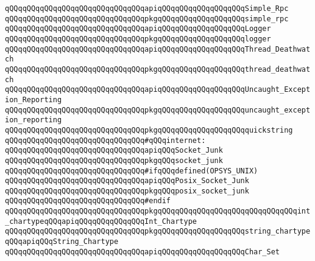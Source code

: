 \newline
\verb|qQQqqQQqqQQqqQQqqQQqqQQqqQQqqQQqapiqQQqqQQqqQQqqQQqqQQqSimple_Rpc|\newline
\verb|qQQqqQQqqQQqqQQqqQQqqQQqqQQqqQQqpkgqQQqqQQqqQQqqQQqqQQqsimple_rpc|\newline
\newline
\verb|qQQqqQQqqQQqqQQqqQQqqQQqqQQqqQQqapiqQQqqQQqqQQqqQQqqQQqLogger|\newline
\verb|qQQqqQQqqQQqqQQqqQQqqQQqqQQqqQQqpkgqQQqqQQqqQQqqQQqqQQqlogger|\newline
\newline
\verb|qQQqqQQqqQQqqQQqqQQqqQQqqQQqqQQqapiqQQqqQQqqQQqqQQqqQQqThread_Deathwatch|\newline
\verb|qQQqqQQqqQQqqQQqqQQqqQQqqQQqqQQqpkgqQQqqQQqqQQqqQQqqQQqthread_deathwatch|\newline
\newline
\verb|qQQqqQQqqQQqqQQqqQQqqQQqqQQqqQQqapiqQQqqQQqqQQqqQQqqQQqUncaught_Exception_Reporting|\newline
\verb|qQQqqQQqqQQqqQQqqQQqqQQqqQQqqQQqpkgqQQqqQQqqQQqqQQqqQQquncaught_exception_reporting|\newline
\newline
\verb|qQQqqQQqqQQqqQQqqQQqqQQqqQQqqQQqpkgqQQqqQQqqQQqqQQqqQQqquickstring|\newline
\newline
\verb|qQQqqQQqqQQqqQQqqQQqqQQqqQQqqQQq#qQQqinternet:|\newline
\verb|qQQqqQQqqQQqqQQqqQQqqQQqqQQqqQQqapiqQQqSocket_Junk|\newline
\verb|qQQqqQQqqQQqqQQqqQQqqQQqqQQqqQQqpkgqQQqsocket_junk|\newline
\verb|qQQqqQQqqQQqqQQqqQQqqQQqqQQqqQQq#ifqQQqdefined(OPSYS_UNIX)|\newline
\verb|qQQqqQQqqQQqqQQqqQQqqQQqqQQqqQQqapiqQQqPosix_Socket_Junk|\newline
\verb|qQQqqQQqqQQqqQQqqQQqqQQqqQQqqQQqpkgqQQqposix_socket_junk|\newline
\verb|qQQqqQQqqQQqqQQqqQQqqQQqqQQqqQQq#endif|\newline
\newline
\verb|qQQqqQQqqQQqqQQqqQQqqQQqqQQqqQQqpkgqQQqqQQqqQQqqQQqqQQqqQQqqQQqqQQqint_chartypeqQQqapiqQQqqQQqqQQqqQQqInt_Chartype|\newline
\verb|qQQqqQQqqQQqqQQqqQQqqQQqqQQqqQQqpkgqQQqqQQqqQQqqQQqqQQqstring_chartypeqQQqapiqQQqString_Chartype|\newline
\newline
\verb|qQQqqQQqqQQqqQQqqQQqqQQqqQQqqQQqapiqQQqqQQqqQQqqQQqqQQqChar_Set|\newline
